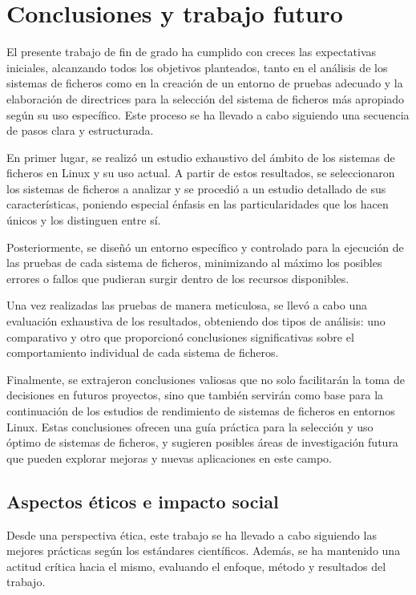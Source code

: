 \chapter{Conclusiones y trabajo futuro}

El presente trabajo de fin de grado ha cumplido con creces las expectativas iniciales, alcanzando todos los objetivos planteados, tanto en el análisis de los sistemas de ficheros como en la creación de un entorno de pruebas adecuado y la elaboración de directrices para la selección del sistema de ficheros más apropiado según su uso específico. Este proceso se ha llevado a cabo siguiendo una secuencia de pasos clara y estructurada.

En primer lugar, se realizó un estudio exhaustivo del ámbito de los sistemas de ficheros en Linux y su uso actual. A partir de estos resultados, se seleccionaron los sistemas de ficheros a analizar y se procedió a un estudio detallado de sus características, poniendo especial énfasis en las particularidades que los hacen únicos y los distinguen entre sí.

Posteriormente, se diseñó un entorno específico y controlado para la ejecución de las pruebas de cada sistema de ficheros, minimizando al máximo los posibles errores o fallos que pudieran surgir dentro de los recursos disponibles.

Una vez realizadas las pruebas de manera meticulosa, se llevó a cabo una evaluación exhaustiva de los resultados, obteniendo dos tipos de análisis: uno comparativo y otro que proporcionó conclusiones significativas sobre el comportamiento individual de cada sistema de ficheros.

Finalmente, se extrajeron conclusiones valiosas que no solo facilitarán la toma de decisiones en futuros proyectos, sino que también servirán como base para la continuación de los estudios de rendimiento de sistemas de ficheros en entornos Linux. Estas conclusiones ofrecen una guía práctica para la selección y uso óptimo de sistemas de ficheros, y sugieren posibles áreas de investigación futura que pueden explorar mejoras y nuevas aplicaciones en este campo.

\section{Aspectos éticos e impacto social}

Desde una perspectiva ética, este trabajo se ha llevado a cabo siguiendo las mejores prácticas según los estándares científicos. Además, se ha mantenido una actitud crítica hacia el mismo, evaluando el enfoque, método y resultados del trabajo.

